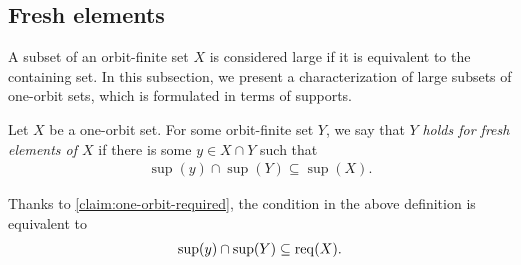 \subsection{Fresh elements}
\label{sec:fresh-elements}

A subset of an orbit-finite set $X$ is considered large if it is equivalent to the containing set. In this subsection, we present a characterization of large subsets of one-orbit sets, which is formulated in terms of supports. 

\begin{definition}
    \label{def:fresh-elements}
    Let $X$ be a one-orbit set. For some orbit-finite set $Y$, we say that $Y$ \emph{holds for fresh elements of $X$} if there is some $y \in X \cap Y$ such that 
    \begin{align*}
    \sup(y) \cap \sup(Y) \subseteq \sup(X).
    \end{align*}
\end{definition}

Thanks to \cref{claim:one-orbit-required}, the condition in the above definition is equivalent to 
\begin{align*}
\sup(y) \cap \sup(Y) \subseteq \operatorname{req}(X).
\end{align*}

